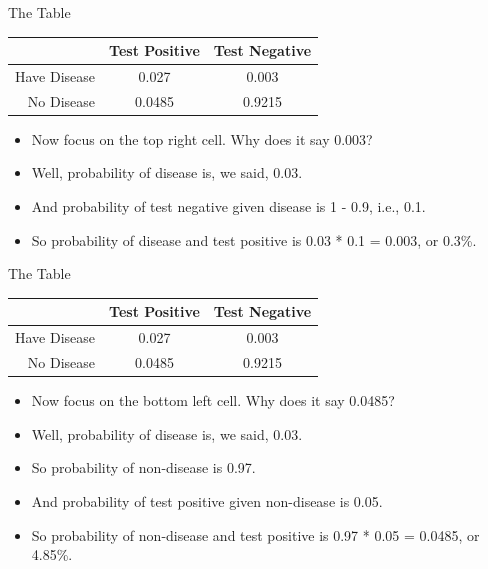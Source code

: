 \documentclass[
  ignorenonframetext,
]{beamer}
\providecommand{\tightlist}{%
  \setlength{\itemsep}{0pt}\setlength{\parskip}{0pt}}
\renewcommand{\,}{\text{, }}
\begin{document}
\begin{frame}{The Table}
\protect\hypertarget{the-table-2}{}
\begin{longtable}[]{@{}rcc@{}}
\toprule
& Test Positive & Test Negative \\
\midrule
\endhead
Have Disease & 0.027 & 0.003 \\
No Disease & 0.0485 & 0.9215 \\
\bottomrule
\end{longtable}

\begin{itemize}
\tightlist
\item
  Now focus on the top right cell. Why does it say 0.003?
\item
  Well, probability of disease is, we said, 0.03.
\item
  And probability of test negative given disease is 1 - 0.9, i.e., 0.1.
\item
  So probability of disease and test positive is 0.03 * 0.1 = 0.003, or
  0.3\%.
\end{itemize}
\end{frame}

\begin{frame}{The Table}
\protect\hypertarget{the-table-3}{}
\begin{longtable}[]{@{}rcc@{}}
\toprule
& Test Positive & Test Negative \\
\midrule
\endhead
Have Disease & 0.027 & 0.003 \\
No Disease & 0.0485 & 0.9215 \\
\bottomrule
\end{longtable}

\begin{itemize}
\tightlist
\item
  Now focus on the bottom left cell. Why does it say 0.0485?
\item
  Well, probability of disease is, we said, 0.03.
\item
  So probability of non-disease is 0.97.
\item
  And probability of test positive given non-disease is 0.05.
\item
  So probability of non-disease and test positive is 0.97 * 0.05 =
  0.0485, or 4.85\%.
\end{itemize}
\end{frame}
\end{document}
